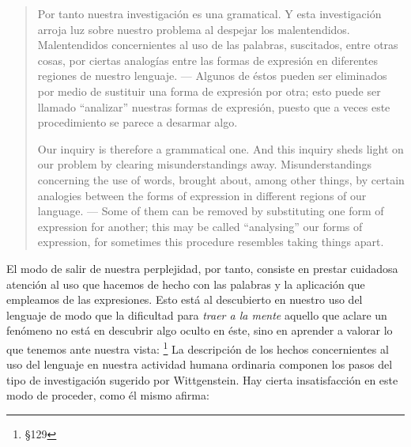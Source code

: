 \blockquote[Our inquiry is therefore a grammatical one. And this inquiry sheds
light on our problem by clearing misunderstandings away. Misunderstandings
concerning the use of words, brought about, among other things, by certain
analogies between the forms of expression in different regions of our language.
--- Some of them can be removed by substituting one form of expression for
another; this may be called \enquote{analysing} our forms of expression, for
sometimes this procedure resembles taking things apart.
{\cite[\S90]{wittgenstein1953phiinv}}]{Por tanto nuestra investigación es una
  gramatical. Y esta investigación arroja luz sobre nuestro problema al despejar
  los malentendidos. Malentendidos concernientes al uso de las palabras,
  suscitados, entre otras cosas, por ciertas analogías entre las formas de
  expresión en diferentes regiones de nuestro lenguaje. --- Algunos de éstos
  pueden ser eliminados por medio de sustituir una forma de expresión por otra;
  esto puede ser llamado \enquote{analizar} nuestras formas de expresión, puesto
  que a veces este procedimiento se parece a desarmar algo.}

El modo de salir de nuestra perplejidad, por tanto, consiste en prestar
cuidadosa atención al uso que hacemos de hecho con las palabras y la aplicación
que empleamos de las expresiones. Esto está al descubierto en nuestro uso del
lenguaje de modo que la dificultad para \emph{traer a la mente} aquello que
aclare un fenómeno no está en descubrir algo oculto en éste, sino en aprender a
valorar lo que tenemos ante nuestra vista: \footnote{\S129} La descripción de los hechos
concernientes al uso del lenguaje en nuestra actividad humana ordinaria componen
los pasos del tipo de investigación sugerido por Wittgenstein. Hay cierta
insatisfacción en este modo de proceder, como él mismo afirma: 

